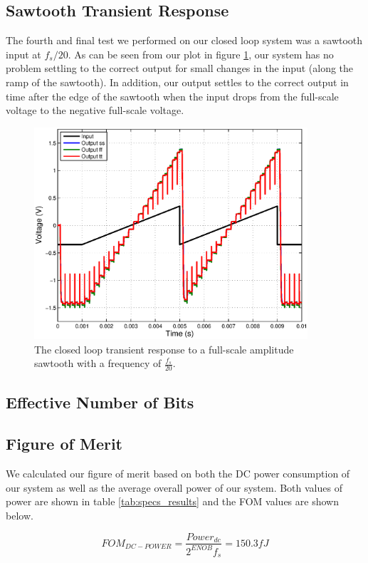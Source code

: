 \documentclass[journal]{IEEEtran}
\begin{document}
\subsection{Sawtooth Transient Response}
The fourth and final test we performed on our closed loop system was a sawtooth input at $f_s/20$. As can be seen from our plot in figure \ref{fig:closed_saw}, our system has no problem settling to the correct output for small changes in the input (along the ramp of the sawtooth). In addition, our output settles to the correct output in time after the edge of the sawtooth when the input drops from the full-scale voltage to the negative full-scale voltage.

\begin{figure}
\centering
\includegraphics[width=4in]{Plots/closed_saw.eps}
\caption{The closed loop transient response to a full-scale amplitude sawtooth with a frequency of $\frac{f_s}{20}$.}
\label{fig:closed_saw}
\end{figure}

\subsection{Effective Number of Bits}

\subsection{Figure of Merit}
We calculated our figure of merit based on both the DC power consumption of our system as well as the average overall power of our system. Both values of power are shown in table \ref{tab:specs_results} and the FOM values are shown below.

\begin{equation}
FOM_{DC-POWER} = \frac{Power_{dc}}{2^{ENOB}f_s} = 150.3 fJ
\end{equation}
\end{document}
